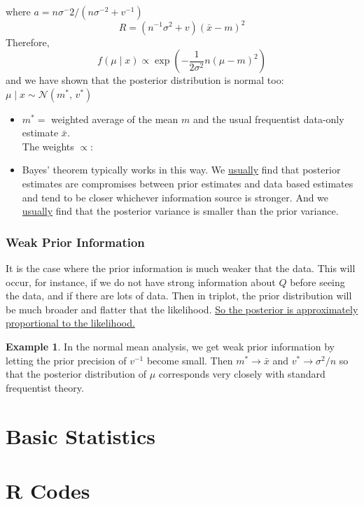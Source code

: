 \documentclass[lecture,12pt,]{pcms-l}
\numberwithin{section}{chapter}
\numberwithin{equation}{chapter}
\theoremstyle{plain}
\theoremstyle{definition}
\newtheorem{example}{Example}[section]
\theoremstyle{definition}
\begin{document}
where $a=n \sigma^-2/(n \sigma^{-2}+v^{-1})$
\begin{equation}
R=(n^{-1}\sigma^2+v)(\bar{x}-m)^2
\end{equation}
Therefore,
\begin{equation}
f(\mu \mid x) \propto \exp\left (  -\frac{1}{2\sigma^2}n(\mu-m)^2 \right )
\end{equation}
and we have shown that the posterior distribution is normal too: $\mu \mid x \sim \mathcal{N}(m^*,\,v^*)$
\begin{itemize}
\item $m^*=$ weighted average of the mean $m$ and the usual frequentist data-only estimate $\bar{x}$. 
\\
The weights $\propto$:
\item Bayes' theorem typically works in this way. We \underline{usually} find that posterior estimates are compromises between prior estimates and data based estimates and tend to be closer whichever information source is stronger. And we \underline{usually} find that the posterior variance is smaller than the prior variance.
\end{itemize}
\subsection{Weak Prior Information}
It is the case where the prior information is much weaker that the data. This will occur, for instance, if we do not have strong information about $Q$ before seeing the  data, and if there are lots of data. Then in triplot, the prior distribution will be much broader and flatter that the likelihood. \underline{So the posterior is approximately proportional to the likelihood.}
\begin{example}
In the normal mean analysis, we get weak prior information by letting the prior precision of $v^{-1}$ become small. Then $m^* \rightarrow \bar{x}$ and $v^* \rightarrow \sigma^2/n$ so that the posterior distribution of $\mu$ corresponds very closely with standard frequentist theory.
\end{example}



\vfill
\eject






\appendix


\chapter*{Basic Statistics}

\chapter*{R Codes}





\end{document}
